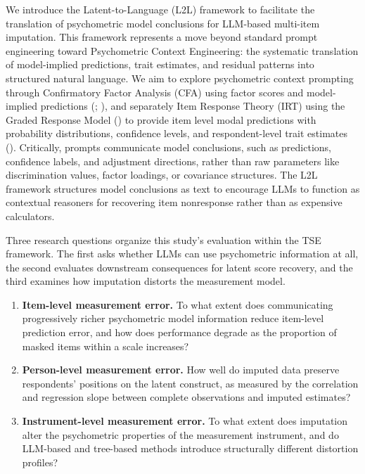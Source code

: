 \documentclass[
  man,
  floatsintext,
  longtable,
  nolmodern,
  notxfonts,
  notimes,
  colorlinks=true,linkcolor=blue,citecolor=blue,urlcolor=blue]{apa7}
\begin{document}
We introduce the Latent-to-Language (L2L) framework to facilitate the
translation of psychometric model conclusions for LLM-based multi-item
imputation. This framework represents a move beyond standard prompt
engineering toward Psychometric Context Engineering: the systematic
translation of model-implied predictions, trait estimates, and residual
patterns into structured natural language. We aim to explore
psychometric context prompting through Confirmatory Factor Analysis
(CFA) using factor scores and model-implied predictions
(; ), and separately Item Response Theory (IRT) using the Graded
Response Model () to provide
item level modal predictions with probability distributions, confidence
levels, and respondent-level trait estimates
(). Critically, prompts
communicate model conclusions, such as predictions, confidence labels,
and adjustment directions, rather than raw parameters like
discrimination values, factor loadings, or covariance structures. The
L2L framework structures model conclusions as text to encourage LLMs to
function as contextual reasoners for recovering item nonresponse rather
than as expensive calculators.

Three research questions organize this study's evaluation within the TSE
framework. The first asks whether LLMs can use psychometric information
at all, the second evaluates downstream consequences for latent score
recovery, and the third examines how imputation distorts the measurement
model.

\begin{enumerate}
\def\labelenumi{\arabic{enumi}.}
\item
  \textbf{Item-level measurement error.} To what extent does
  communicating progressively richer psychometric model information
  reduce item-level prediction error, and how does performance degrade
  as the proportion of masked items within a scale increases?
\item
  \textbf{Person-level measurement error.} How well do imputed data
  preserve respondents' positions on the latent construct, as measured
  by the correlation and regression slope between complete observations
  and imputed estimates?
\item
  \textbf{Instrument-level measurement error.} To what extent does
  imputation alter the psychometric properties of the measurement
  instrument, and do LLM-based and tree-based methods introduce
  structurally different distortion profiles?
\end{enumerate}
\end{document}
